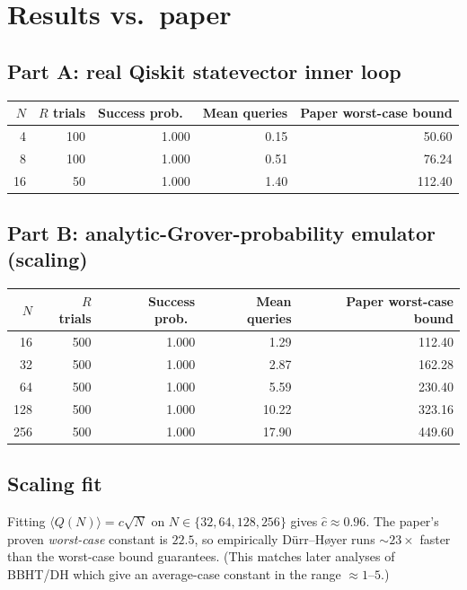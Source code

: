 \documentclass[11pt]{article}
\begin{document}
\section{Results vs.\ paper}

\subsection*{Part A: real Qiskit statevector inner loop}
\begin{center}
\begin{tabular}{rrrrr}
\toprule
$N$ & $R$ trials & Success prob.\ & Mean queries & Paper worst-case bound \\
\midrule
 4  & 100 & 1.000 &  0.15 & 50.60 \\
 8  & 100 & 1.000 &  0.51 & 76.24 \\
 16 &  50 & 1.000 &  1.40 & 112.40 \\
\bottomrule
\end{tabular}
\end{center}

\subsection*{Part B: analytic-Grover-probability emulator (scaling)}
\begin{center}
\begin{tabular}{rrrrr}
\toprule
$N$ & $R$ trials & Success prob.\ & Mean queries & Paper worst-case bound \\
\midrule
  16 & 500 & 1.000 &  1.29 & 112.40 \\
  32 & 500 & 1.000 &  2.87 & 162.28 \\
  64 & 500 & 1.000 &  5.59 & 230.40 \\
 128 & 500 & 1.000 & 10.22 & 323.16 \\
 256 & 500 & 1.000 & 17.90 & 449.60 \\
\bottomrule
\end{tabular}
\end{center}

\subsection*{Scaling fit}
Fitting $\langle Q(N)\rangle = c\sqrt{N}$ on $N\in\{32,64,128,256\}$ gives
$\hat c \approx 0.96$. The paper's proven \emph{worst-case} constant is
$22.5$, so empirically Dürr--Høyer runs $\sim 23\times$ faster than the
worst-case bound guarantees. (This matches later analyses of BBHT/DH
which give an average-case constant in the range $\approx 1\text{--}5$.)
\end{document}
